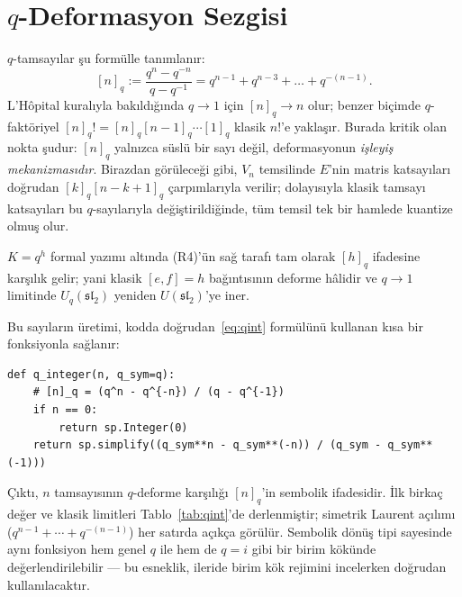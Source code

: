 \documentclass[12pt,a4paper,fleqn]{report}
\newcommand{\normalsemi}{;}
\newcommand{\normalsemi}{\begingroup\semicolonfont;\endgroup}
\numberwithin{equation}{chapter}
\theoremstyle{plain}
\theoremstyle{definition}
\renewcommand{\sl}{\mathfrak{sl}}
\newcommand{\Uq}{U_q(\sl_2)}
\newcommand{\qint}[1]{[#1]_q}
\newcommand{\qfact}[1]{[#1]_q!}
\begin{document}
\section{$q$-Deformasyon Sezgisi}

$q$-tamsayılar şu formülle tanımlanır:
\begin{equation}\label{eq:qint}
  \qint{n} := \frac{q^n - q^{-n}}{q - q^{-1}} = q^{n-1} + q^{n-3} + \dots + q^{-(n-1)}.
\end{equation}
L'H{\^o}pital kuralıyla bakıldığında $q\to 1$ için $\qint{n}\to n$ olur\normalsemi{} benzer
biçimde $q$-faktöriyel $\qfact{n} = \qint{n}\qint{n-1}\cdots\qint{1}$ klasik
$n!$'e yaklaşır. Burada kritik olan nokta şudur: $\qint{n}$ yalnızca süslü bir
sayı değil, deformasyonun \emph{işleyiş mekanizmasıdır}. Birazdan görüleceği
gibi, $V_n$ temsilinde $E$'nin matris katsayıları doğrudan
$\qint{k}\qint{n-k+1}$ çarpımlarıyla verilir\normalsemi{} dolayısıyla klasik tamsayı
katsayıları bu $q$-sayılarıyla değiştirildiğinde, tüm temsil tek bir hamlede
kuantize olmuş olur.

$K = q^h$ formal yazımı altında (R4)'ün sağ tarafı tam olarak $\qint{h}$
ifadesine karşılık gelir\normalsemi{} yani klasik $[e,f] = h$ bağıntısının deforme hâlidir
ve $q\to 1$ limitinde $\Uq$ yeniden $U(\sl_2)$'ye iner.

Bu sayıların üretimi, kodda doğrudan~\eqref{eq:qint} formülünü kullanan kısa bir
fonksiyonla sağlanır:

\begin{lstlisting}[style=pyblock,caption={$q$-Tamsayının SymPy İle Modellenmesi}]
def q_integer(n, q_sym=q):
    # [n]_q = (q^n - q^{-n}) / (q - q^{-1})
    if n == 0:
        return sp.Integer(0)
    return sp.simplify((q_sym**n - q_sym**(-n)) / (q_sym - q_sym**(-1)))
\end{lstlisting}

Çıktı, $n$ tamsayısının $q$-deforme karşılığı $\qint{n}$'in sembolik ifadesidir.
İlk birkaç değer ve klasik limitleri Tablo~\ref{tab:qint}'de derlenmiştir\normalsemi{}
simetrik Laurent açılımı ($q^{n-1}+\cdots+q^{-(n-1)}$) her satırda açıkça
görülür. Sembolik dönüş tipi sayesinde aynı fonksiyon hem genel $q$ ile hem de
$q=i$ gibi bir birim kökünde değerlendirilebilir --- bu esneklik, ileride birim
kök rejimini incelerken doğrudan kullanılacaktır.
\end{document}
